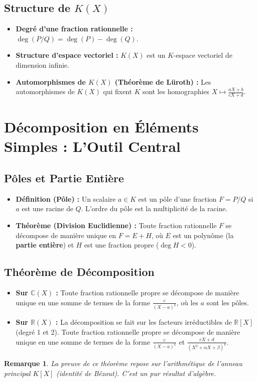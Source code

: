\documentclass[12pt, a4paper, parskip=full]{report}
\theoremstyle{agregstyle}
\newtheorem{remark}[definition]{Remarque}
\begin{document}
\subsection{Structure de $K(X)$}
\begin{itemize}
    \item \textbf{Degré d'une fraction rationnelle :} $\deg(P/Q) = \deg(P) - \deg(Q)$.
    \item \textbf{Structure d'espace vectoriel :} $K(X)$ est un $K$-espace vectoriel de dimension infinie.
    \item \textbf{Automorphismes de $K(X)$ (Théorème de Lüroth) :} Les automorphismes de $K(X)$ qui fixent $K$ sont les homographies $X \mapsto \frac{aX+b}{cX+d}$.
\end{itemize}

\section{Décomposition en Éléments Simples : L'Outil Central}

\subsection{Pôles et Partie Entière}
\begin{itemize}
    \item \textbf{Définition (Pôle) :} Un scalaire $a \in K$ est un pôle d'une fraction $F=P/Q$ si $a$ est une racine de $Q$. L'ordre du pôle est la multiplicité de la racine.
    \item \textbf{Théorème (Division Euclidienne) :} Toute fraction rationnelle $F$ se décompose de manière unique en $F = E + H$, où $E$ est un polynôme (la \textbf{partie entière}) et $H$ est une fraction propre ($\deg H < 0$).
\end{itemize}

\subsection{Théorème de Décomposition}
\begin{itemize}
    \item \textbf{Sur $\mathbb{C}(X)$ :} Toute fraction rationnelle propre se décompose de manière unique en une somme de termes de la forme $\frac{c}{(X-a)^k}$, où les $a$ sont les pôles.
    \item \textbf{Sur $\mathbb{R}(X)$ :} La décomposition se fait sur les facteurs irréductibles de $\mathbb{R}[X]$ (degré 1 et 2). Toute fraction rationnelle propre se décompose de manière unique en une somme de termes de la forme $\frac{c}{(X-a)^k}$ et $\frac{cX+d}{(X^2+\alpha X+\beta)^k}$.
\end{itemize}
\begin{remark}
    La preuve de ce théorème repose sur l'arithmétique de l'anneau principal $K[X]$ (identité de Bézout). C'est un pur résultat d'algèbre.
\end{remark}
\end{document}
